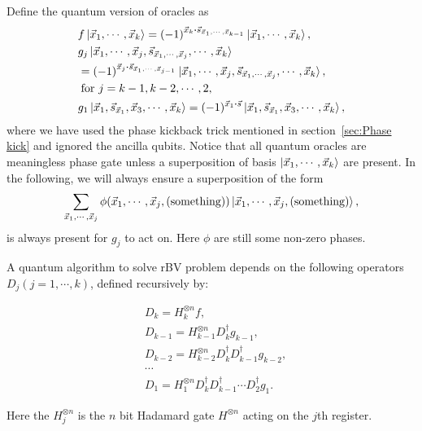 \documentclass{article}
\begin{document}
Define the quantum version of oracles as
\begin{align}
  & f\ket{\vec{x}_1,\cdots,\vec{x}_k} =
  (-1)^{\vec{x}_k\vdot\vec{s}_{\vec{x}_1,\cdots,\vec{x}_{k-1}}} 
  \ket{\vec{x}_1,\cdots,\vec{x}_k},\\
  & g_j \ket{\vec{x}_1,\cdots, \vec{x}_j, 
    \vec{s}_{\vec{x}_1,\cdots,\vec{x}_j} ,\cdots,\vec{x}_k}\nonumber\\
  & = (-1)^{\vec{x}_j \vdot \vec{s}_{\vec{x}_1,\cdots,\vec{x}_{j-1}}}
    \ket{\vec{x}_1,\cdots, \vec{x}_j, 
    \vec{s}_{\vec{x}_1,\cdots,\vec{x}_j} ,\cdots,\vec{x}_k},\nonumber\\
  & \;\text{for } j=k-1,k-2,\cdots ,2,\\
  & g_1 \ket{\vec{x}_1, \vec{s}_{\vec{x}_1}, \vec{x}_3, \cdots,\vec{x}_k} =
  (-1)^{\vec{x}_1 \vdot \vec{s}} \ket{\vec{x}_1, \vec{s}_{\vec{x}_1}, \vec{x}_3, \cdots,\vec{x}_k},
\end{align}
where we have used the phase kickback trick mentioned in section~\ref{sec:Phase
kick} and ignored the ancilla qubits. Notice that all quantum oracles are
meaningless phase gate unless a superposition of basis
$\ket{\vec{x}_1,\cdots,\vec{x}_k}$ are present. In the following, we will always
ensure a superposition of the form 
\[
  \sum_{\vec{x}_1,\cdots,\vec{x}_j} \phi(\vec{x}_1,\cdots,\vec{x}_j,\text{(something)})
  \ket{\vec{x}_1,\cdots,\vec{x}_j,\text{(something)}},
\]
is always present for $g_j$ to act on. Here $\phi$ are still some non-zero phases.

A quantum algorithm to solve rBV problem depends on the following operators
$D_j(j=1,\cdots,k)$, defined recursively by:

\begin{align}
  &D_k = H^{\otimes n}_{k} f, \\
  &D_{k-1} = H^{\otimes n}_{k-1} D^\dagger_k g_{k-1}, \\
  &D_{k-2} = H^{\otimes n}_{k-2} D^\dagger_k D^\dagger_{k-1} g_{k-2}, \\
  &\cdots \\
  &D_1 = H^{\otimes n}_1 D^\dagger_k D^\dagger_{k-1}\cdots D^\dagger_2 g_1.
\end{align}

Here the $H^{\otimes n}_j$ is the $n$ bit Hadamard gate $H^{\otimes n}$ acting
on the $j$th register.
\end{document}
